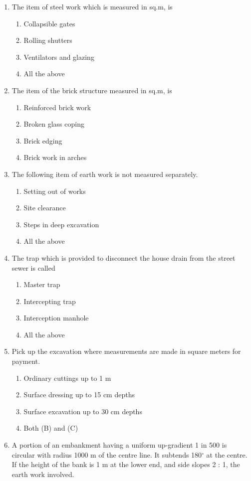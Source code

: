 \documentclass[11pt,a4paper]{article}
\begin{document}
\begin{enumerate}
\item{The item of steel work which is measured in sq.m, is}
\begin{enumerate}[label=\Alph*.]
\item{Collapsible gates}
\item{Rolling shutters}
\item{Ventilators and glazing}
\item{All the above}
\end{enumerate}
\item{The item of the brick structure measured in sq.m, is}
\begin{enumerate}[label=\Alph*.]
\item{Reinforced brick work}
\item{Broken glass coping}
\item{Brick edging}
\item{Brick work in arches}
\end{enumerate}
\item{The following item of earth work is not measured separately.}
\begin{enumerate}[label=\Alph*.]
\item{Setting out of works}
\item{Site clearance}
\item{Steps in deep excavation}
\item{All the above}
\end{enumerate}
\item{The trap which is provided to disconnect the house drain from the street sewer is called}
\begin{enumerate}[label=\Alph*.]
\item{Master trap}
\item{Intercepting trap}
\item{Interception manhole}
\item{All the above}
\end{enumerate}
\item{Pick up the excavation where measurements are made in square meters for payment.}
\begin{enumerate}[label=\Alph*.]
\item{Ordinary cuttings up to 1 m}
\item{Surface dressing up to 15 cm depths}
\item{Surface excavation up to 30 cm depths}
\item{Both (B) and (C)}
\end{enumerate}
\item{A portion of an embankment having a uniform up-gradient 1 in 500 is circular with radius 1000 m of the centre line. It subtends 180$^\circ$ at the centre. If the height of the bank is 1 m at the lower end, and side slopes 2 : 1, the earth work involved.
}
\end{enumerate}
\end{document}
